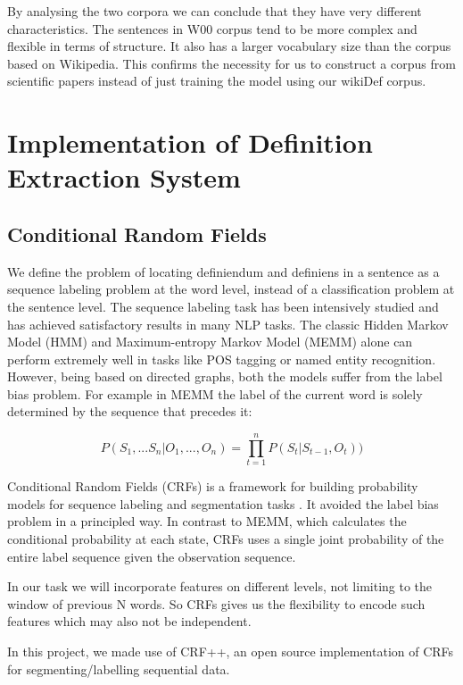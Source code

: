 \documentclass[hyp]{socreport}
\begin{document}
By analysing the two corpora we can conclude that they have very different
characteristics. The sentences in W00 corpus tend to be more complex and flexible in
terms of structure. It also has a larger vocabulary size than the corpus based on
Wikipedia. This confirms the necessity for us to construct a corpus from scientific papers
instead of just training the model using our wikiDef corpus.


\chapter{Implementation of Definition Extraction System}
\section{Conditional Random Fields}

We define the problem of locating definiendum and definiens in a sentence as a sequence labeling problem at the word level, instead of a classification problem at the sentence
level. The sequence labeling task has been intensively studied and has achieved
satisfactory results in many NLP tasks. The classic Hidden Markov Model (HMM) and
Maximum-entropy Markov Model (MEMM) alone can perform extremely well in tasks
like POS tagging or named entity recognition. However, being based on directed graphs,
both the models suffer from the label bias problem. For example in MEMM the label of
the current word is solely determined by the sequence that precedes it:

\begin{displaymath}
P(S_1,...S_n|O_1,...,O_n) = \prod_{t=1}^{n}P(S_t|S_{t-1},O_t))
\end{displaymath}

\noindent
Conditional Random Fields (CRFs) is a framework for building probability models for sequence labeling and segmentation tasks \cite{Lafferty01}. It avoided the label bias problem in a principled way. In contrast to MEMM, which calculates the conditional probability at each state, CRFs uses a single joint probability of the entire label sequence given the observation sequence. 

In our task we will incorporate features on different levels, not limiting to the window of previous N words. So CRFs gives us the flexibility to encode such features which may also not be independent.  

In this project, we made use of CRF++, an open source implementation of CRFs for segmenting/labelling sequential data.
\end{document}

